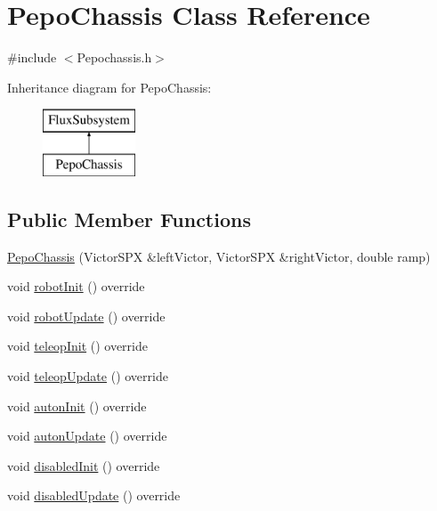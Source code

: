 \hypertarget{classPepoChassis}{}\section{Pepo\+Chassis Class Reference}
\label{classPepoChassis}


{\ttfamily \#include $<$Pepochassis.\+h$>$}

Inheritance diagram for Pepo\+Chassis\+:\begin{figure}[H]
\begin{center}
\leavevmode
\includegraphics[height=2.000000cm]{classPepoChassis}
\end{center}
\end{figure}
\subsection*{Public Member Functions}
\begin{DoxyCompactItemize}
\item 
\hyperlink{classPepoChassis_a7671239e4338a851b31322b743e1d648}{Pepo\+Chassis} (Victor\+S\+PX \&left\+Victor, Victor\+S\+PX \&right\+Victor, double ramp)
\item 
void \hyperlink{classPepoChassis_a18dd25fff35cf7ccac6b710e329873e6}{robot\+Init} () override
\item 
void \hyperlink{classPepoChassis_acd6fa29da41ac5108af7e3a1f15218aa}{robot\+Update} () override
\item 
void \hyperlink{classPepoChassis_a44dbc37a56fe98d7b57af840e8da73b2}{teleop\+Init} () override
\item 
void \hyperlink{classPepoChassis_af863b7df039af7051b08c051f744e429}{teleop\+Update} () override
\item 
void \hyperlink{classPepoChassis_a10380f1dad79ff1daa295d0673a1051f}{auton\+Init} () override
\item 
void \hyperlink{classPepoChassis_ab1e73685898517c8fa2f81c5c7a6a56c}{auton\+Update} () override
\item 
void \hyperlink{classPepoChassis_af5f6848de51ac4c47cbf2f9f706b1485}{disabled\+Init} () override
\item 
void \hyperlink{classPepoChassis_a33af04df9c2396d6197f3298172763d9}{disabled\+Update} () override
\end{DoxyCompactItemize}


